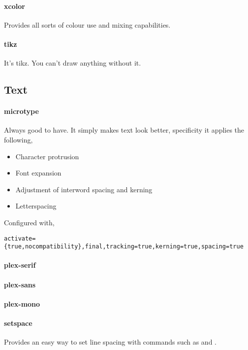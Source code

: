 \documentclass[solid,math,chem,code,plot,gloss]{bmc}
\begin{document}
\paragraph{\ttfamily xcolor}\label{par:xcolor}
Provides all sorts of colour use and mixing capabilities.
\paragraph{\ttfamily tikz}\label{par:tikz}
It's tikz. You can't draw anything without it.

\subsection{Text}

\paragraph{\ttfamily microtype}\label{par:microtype}
Always good to have. It simply makes text look better, specificity it applies the following,
\begin{itemize}
    \item Character protrusion
    \item Font expansion
    \item Adjustment of interword spacing and kerning
    \item Letterspacing
\end{itemize}
Configured with,
\begin{verbatim}
activate={true,nocompatibility},final,tracking=true,kerning=true,spacing=true
\end{verbatim}
\paragraph{\ttfamily plex-serif}\label{par:plex-serif}
\paragraph{\ttfamily plex-sans}\label{par:plex-sans}
\paragraph{\ttfamily plex-mono}\label{par:plex-mono}
\paragraph{\ttfamily setspace}\label{par:setspace}
Provides an easy way to set line spacing with commands such as
\texttt{\doublespacing} and \texttt{}.
\end{document}
